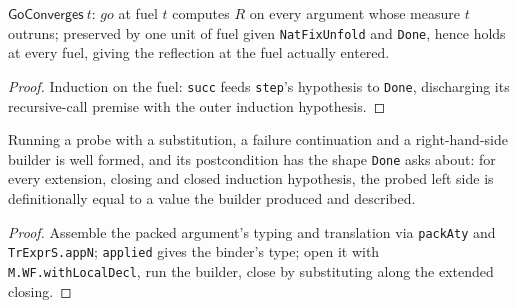 \begin{theorem}
\label{vpc:thm:goconverges}
\leanok
{}

 $\mathsf{GoConverges}\ t$: $\mathit{go}$ at fuel $t$ computes $R$ on every
argument whose measure $t$ outruns; preserved by one unit of fuel given \texttt{NatFixUnfold} and
\texttt{Done}, hence holds at every fuel, giving the reflection at the fuel actually entered.
\end{theorem}
\begin{proof}\leanok
{}
 Induction on the fuel: \texttt{succ} feeds \texttt{step}'s hypothesis to
\texttt{Done}, discharging its recursive-call premise with the outer induction hypothesis.
\end{proof}

\begin{theorem}
\label{vpc:thm:probebundle-probe-wf}\leanok
{}

 Running a probe with a substitution, a failure continuation and a
right-hand-side builder is well formed, and its postcondition has the shape \texttt{Done} asks
about: for every extension, closing and closed induction hypothesis, the probed left side is
definitionally equal to a value the builder produced and described.
\end{theorem}
\begin{proof}\leanok
{}
 Assemble the packed argument's typing and translation via \texttt{packAty} and
\texttt{TrExprS.appN}; \texttt{applied} gives the binder's type; open it with
\texttt{M.WF.withLocalDecl}, run the builder, close by substituting along the extended closing.
\end{proof}


